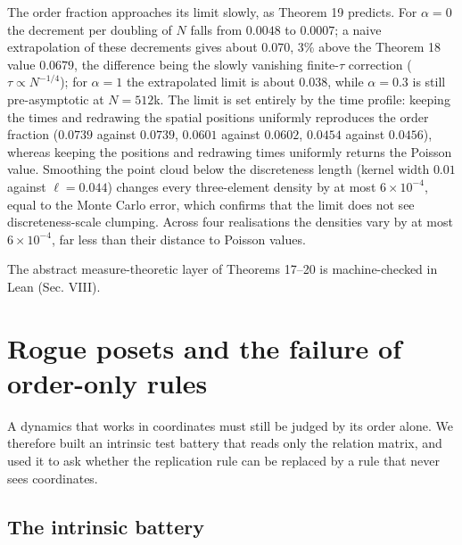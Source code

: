 The order fraction approaches its limit slowly, as Theorem
19 predicts. For \(\alpha=0\) the decrement per doubling of
\(N\) falls from \(0.0048\) to \(0.0007\); a naive
extrapolation of these decrements gives about \(0.070\), 3\%
above the Theorem 18 value \(0.0679\), the difference being
the slowly vanishing finite-\(\tau\) correction
(\(\tau\propto N^{-1/4}\)); for \(\alpha=1\) the
extrapolated limit is about \(0.038\), while \(\alpha=0.3\)
is still pre-asymptotic at \(N=512\)k. The limit is set
entirely by the time profile: keeping the times and
redrawing the spatial positions uniformly reproduces the
order fraction (\(0.0739\) against \(0.0739\), \(0.0601\)
against \(0.0602\), \(0.0454\) against \(0.0456\)), whereas
keeping the positions and redrawing times uniformly returns
the Poisson value. Smoothing the point cloud below the
discreteness length (kernel width \(0.01\) against
\(\ell=0.044\)) changes every three-element density by at
most \(6\times10^{-4}\), equal to the Monte Carlo error,
which confirms that the limit does not see
discreteness-scale clumping. Across four realisations the
densities vary by at most \(6\times10^{-4}\), far less than
their distance to Poisson values.

The abstract measure-theoretic layer of Theorems 17--20 is
machine-checked in Lean (Sec. VIII).

\hypertarget{rogue-posets-and-the-failure-of-order-only-rules}{%
\section{Rogue posets and the failure of order-only
rules}\label{rogue-posets-and-the-failure-of-order-only-rules}}

A dynamics that works in coordinates must still be judged by
its order alone. We therefore built an intrinsic test
battery that reads only the relation matrix, and used it to
ask whether the replication rule can be replaced by a rule
that never sees coordinates.

\hypertarget{the-intrinsic-battery}{%
\subsection{The intrinsic
battery}\label{the-intrinsic-battery}}

